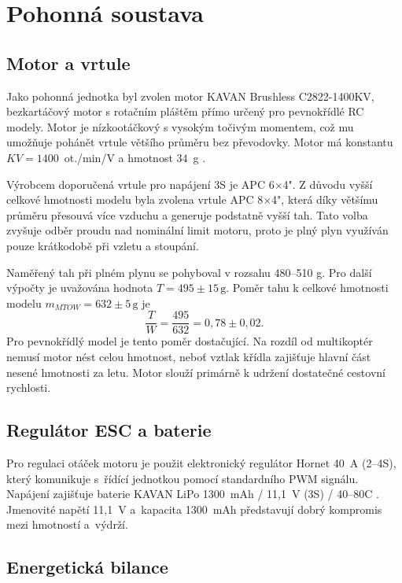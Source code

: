 \documentclass[12pt, a4paper, oneside]{report}
\begin{document}
\section{Pohonná soustava}

\subsection{Motor a vrtule}

Jako pohonná jednotka byl zvolen motor KAVAN Brushless 
C2822-1400KV, bezkartáčový motor s rotačním pláštěm 
 přímo určený pro pevnokřídlé RC modely. 
Motor je nízkootáčkový s vysokým točivým momentem, což mu 
umožňuje pohánět vrtule většího průměru bez převodovky. 
Motor má konstantu $KV = 1400$~ot./min/V a hmotnost $34$~g \cite{kavan_motor}.

Výrobcem doporučená vrtule pro napájení 3S je APC 6$\times$4". 
Z důvodu vyšší celkové hmotnosti modelu byla zvolena vrtule 
APC 8$\times$4", která díky většímu průměru přesouvá 
více vzduchu a generuje podstatně vyšší tah. 
Tato volba zvyšuje odběr proudu nad nominální limit motoru, 
proto je plný plyn využíván pouze krátkodobě při vzletu 
a stoupání.

Naměřený tah při plném plynu se pohyboval v rozsahu 480–510 g. Pro další výpočty je uvažována hodnota $T = 495 \pm 15 \, \text{g}$. Poměr tahu k celkové hmotnosti modelu 
$m_{MTOW} = 632 \pm 5 \, \text{g} $ je
\[
\frac{T}{W} = \frac{495}{632} = 0{,}78 \pm 0{,}02 .
\]
Pro pevnokřídlý model je tento poměr dostačující. Na rozdíl 
od multikoptér nemusí motor nést celou hmotnost, neboť 
vztlak křídla zajišťuje hlavní část nesené hmotnosti za letu. 
Motor slouží primárně k udržení dostatečné cestovní rychlosti.

\subsection{Regulátor ESC a baterie}

Pro regulaci otáček motoru je použit elektronický regulátor Hornet 40~A
(2--4S), který komunikuje s~řídící jednotkou pomocí standardního PWM signálu.
Napájení zajišťuje baterie KAVAN LiPo 1300~mAh / 11{,}1~V (3S) / 40--80C \cite{kavan_lipo}.
Jmenovité napětí 11{,}1~V a~kapacita 1300~mAh představují dobrý kompromis
mezi hmotností a~výdrží.

\subsection{Energetická bilance}
\end{document}
